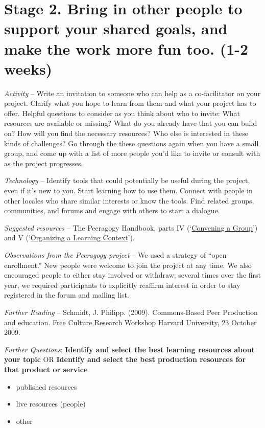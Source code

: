 \section*{Stage 2. Bring in other people to support your shared goals,
and make the work more fun too. (1-2
weeks)}\label{stage-2.-bring-in-other-people-to-support-your-shared-goals-and-make-the-work-more-fun-too.-1-2-weeks}

\emph{Activity} -- Write an invitation to someone who can help as a
co-facilitator on your project. Clarify what you hope to learn from them
and what your project has to offer. Helpful questions to consider as you
think about who to invite: What resources are available or missing? What
do you already have that you can build on? How will you find the
necessary resources? Who else is interested in these kinds of
challenges? Go through the these questions again when you have a small
group, and come up with a list of more people you'd like to invite or
consult with as the project progresses.

\emph{Technology} -- Identify tools that could potentially be useful
during the project, even if it's new to you. Start learning how to use
them. Connect with people in other locales who share similar interests
or know the tools. Find related groups, communities, and forums and
engage with others to start a dialogue.

\emph{Suggested resources} -- The Peeragogy Handbook, parts IV
(`\href{http://peeragogy.org/convening-a-group/}{Convening a Group}')
and V
(`\href{http://peeragogy.org/organizing-a-learning-context/}{Organizing
a Learning Context}').

\emph{Observations from the Peeragogy project} -- We used a strategy of
``open enrollment.'' New people were welcome to join the project at any
time. We also encouraged people to either stay involved or withdraw;
several times over the first year, we required participants to
explicitly reaffirm interest in order to stay registered in the forum
and mailing list.

\emph{Further Reading} -- Schmidt, J. Philipp. (2009). Commons-Based
Peer Production and education. Free Culture Research Workshop Harvard
University, 23 October 2009.

\emph{Further Questions}: \textbf{Identify and select the best learning
resources about your topic} OR \textbf{Identify and select the best
production resources for that product or service}

\begin{itemize}
\itemsep1pt\parskip0pt
\item
  published resources
\item
  live resources (people)
\item
  other
\end{itemize}


